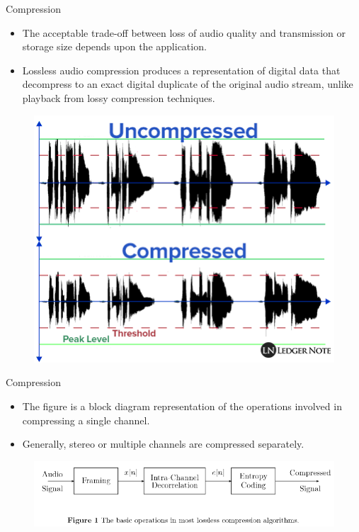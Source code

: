 \documentclass{beamer}
\begin{document}
\begin{frame}{Compression}
	\begin{itemize}
	\item{
		The acceptable trade-off between loss of audio quality and transmission or storage size depends upon the application. 
		}
	\item{
		Lossless audio compression produces a representation of digital data that decompress to an exact digital duplicate of the original audio stream, unlike playback from lossy compression techniques.
	}
	\end{itemize}
	\begin{figure}
		\includegraphics[scale=0.42]{comp.png}
	\end{figure} 
\end{frame}

\begin{frame}{Compression}
  \begin{itemize}
  \item {
    The figure is a block diagram representation of the operations involved in compressing a single channel.
  }
  \item{
  	Generally, stereo or multiple channels are compressed separately.
  }
  \end{itemize}
  \begin{figure}
		\includegraphics[scale=0.42]{fig1.png}
	\end{figure}  
\end{frame}
\end{document}
